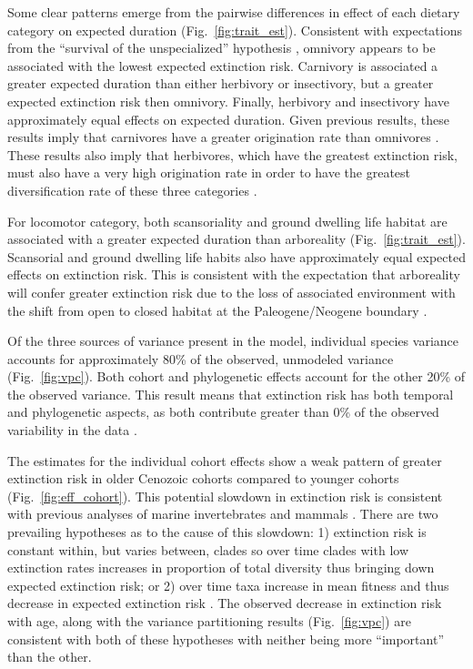 \documentclass[12pt]{article}
\begin{document}
Some clear patterns emerge from the pairwise differences in effect of each dietary category on expected duration (Fig.~\ref{fig:trait_est}). Consistent with expectations from the ``survival of the unspecialized'' hypothesis \cite{Liow2004a,Simpson1944}, omnivory appears to be associated with the lowest expected extinction risk. Carnivory is associated a greater expected duration than either herbivory or insectivory, but a greater expected extinction risk then omnivory. Finally, herbivory and insectivory have approximately equal effects on expected duration. Given previous results, these results imply that carnivores have a greater origination rate than omnivores \cite{Price2012}. These results also imply that herbivores, which have the greatest extinction risk, must also have a very high origination rate in order to have the greatest diversification rate of these three categories \cite{Price2012}. 

For locomotor category, both scansoriality and ground dwelling life habitat are associated with a greater expected duration than arboreality (Fig.~\ref{fig:trait_est}). Scansorial and ground dwelling life habits also have approximately equal expected effects on extinction risk.  This is consistent with the expectation that arboreality will confer greater extinction risk due to the loss of associated environment with the shift from open to closed habitat at the Paleogene/Neogene boundary \cite{Blois2009}.

Of the three sources of variance present in the model, individual species variance accounts for approximately 80\% of the observed, unmodeled variance (Fig.~\ref{fig:vpc}). Both cohort and phylogenetic effects account for the other 20\% of the observed variance. This result means that extinction risk has both temporal and phylogenetic aspects, as both contribute greater than 0\% of the observed variability in the data \cite{Housworth2004}.

The estimates for the individual cohort effects show a weak pattern of greater extinction risk in older Cenozoic cohorts compared to younger cohorts (Fig.~\ref{fig:eff_cohort}). This potential slowdown in extinction risk is consistent with previous analyses of marine invertebrates \cite{Raup1982a,Foote2003} and mammals \cite{Alroy2010c,Alroy2000g}. There are two prevailing hypotheses as to the cause of this slowdown: 1) extinction risk is constant within, but varies between, clades so over time clades with low extinction rates increases in proportion of total diversity thus bringing down expected extinction risk; or 2) over time taxa increase in mean fitness and thus decrease in expected extinction risk \cite{Raup1982a}. The observed decrease in extinction risk with age, along with the variance partitioning results (Fig.~\ref{fig:vpc}) are consistent with both of these hypotheses with neither being more ``important'' than the other. 
\end{document}
